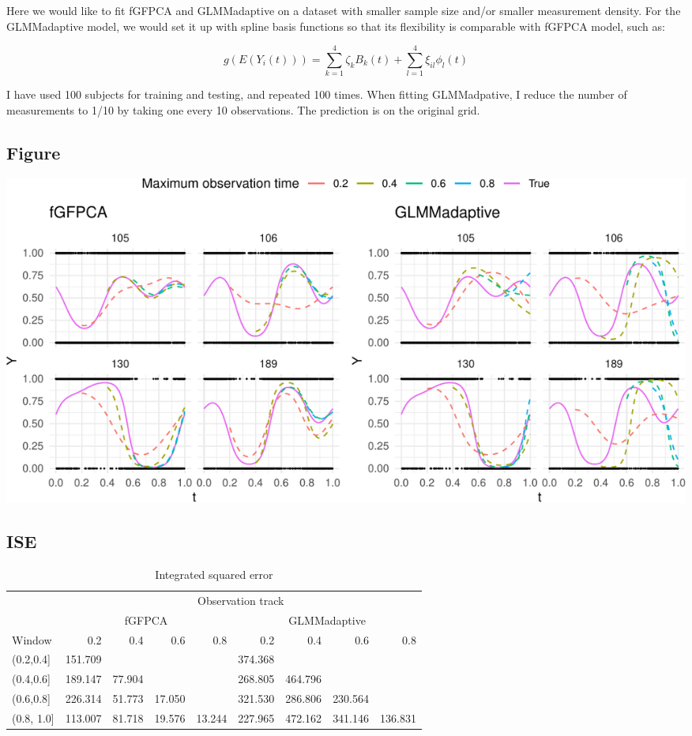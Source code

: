 \documentclass[
]{article}
\begin{document}
Here we would like to fit fGFPCA and GLMMadaptive on a dataset with
smaller sample size and/or smaller measurement density. For the
GLMMadaptive model, we would set it up with spline basis functions so
that its flexibility is comparable with fGFPCA model, such as:

\[g(E(Y_i(t))) = \sum_{k=1}^4\zeta_{k}B_k(t)+\sum_{l=1}^4\xi_{il}\phi_l(t)\]

I have used 100 subjects for training and testing, and repeated 100
times. When fitting GLMMadpative, I reduce the number of measurements to
1/10 by taking one every 10 observations. The prediction is on the
original grid.

\hypertarget{figure-1}{%
\subsection{Figure}\label{figure-1}}

\includegraphics{manuscript_files/figure-latex/fit_sim_small-1.pdf}

\hypertarget{ise-1}{%
\subsection{ISE}\label{ise-1}}

\begin{table}

\caption{\label{tab:unnamed-chunk-8}Integrated squared error}
\centering
\begin{tabular}[t]{lrrrrrrrr}
\toprule
\multicolumn{1}{c}{ } & \multicolumn{8}{c}{Observation track} \\
\cmidrule(l{3pt}r{3pt}){2-9}
\multicolumn{1}{c}{ } & \multicolumn{4}{c}{fGFPCA} & \multicolumn{4}{c}{GLMMadaptive} \\
\cmidrule(l{3pt}r{3pt}){2-5} \cmidrule(l{3pt}r{3pt}){6-9}
Window & 0.2 & 0.4 & 0.6 & 0.8 & 0.2 & 0.4 & 0.6 & 0.8\\
\midrule
(0.2,0.4] & 151.709 &  &  &  & 374.368 &  &  & \\
(0.4,0.6] & 189.147 & 77.904 &  &  & 268.805 & 464.796 &  & \\
(0.6,0.8] & 226.314 & 51.773 & 17.050 &  & 321.530 & 286.806 & 230.564 & \\
(0.8, 1.0] & 113.007 & 81.718 & 19.576 & 13.244 & 227.965 & 472.162 & 341.146 & 136.831\\
\bottomrule
\end{tabular}
\end{table}
\end{document}
